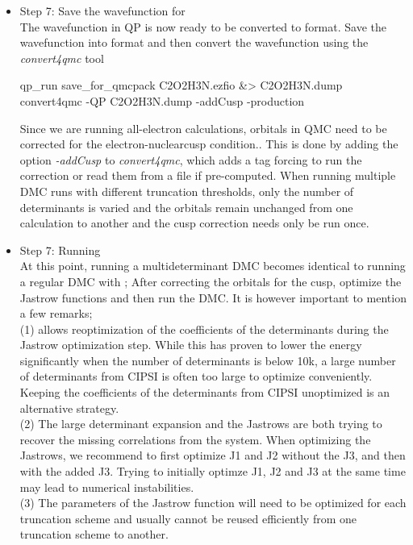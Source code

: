 \begin{itemize}
\item Step 7: Save the wavefunction for \qmcpack \\
The wavefunction in QP is now ready to be converted to \qmcpack format.
Save the wavefunction into \qmcpack format and then convert the wavefunction using the \textit{convert4qmc} tool\\

\begin{shade}
qp_run save_for_qmcpack C2O2H3N.ezfio &> C2O2H3N.dump  
convert4qmc -QP C2O2H3N.dump -addCusp -production
\end{shade}

Since we are running all-electron calculations, orbitals in QMC need
to be corrected for the electron-nuclearcusp condition..  This is done
by adding the option \textit{-addCusp} to \textit{convert4qmc}, which
adds a tag forcing \qmcpack to run the correction or read them from a
file if pre-computed. When running multiple DMC runs with different
truncation thresholds, only the number of determinants is varied and
the orbitals remain unchanged from one calculation to another and the
cusp correction needs only be run once.

\item Step 7: Running \qmcpack \\
At this point, running a multideterminant DMC becomes identical to running a regular DMC with \qmcpack; 
After correcting the orbitals for the cusp, optimize the Jastrow functions and then run the DMC. 
It is however important to mention a few remarks;\\

(1) \qmcpack allows reoptimization of the coefficients of the
determinants during the Jastrow optimization step. While this has
proven to lower the energy significantly when the number of
determinants is below 10k, a large number of determinants from CIPSI
is often too large to optimize conveniently. Keeping the coefficients
of the determinants from CIPSI unoptimized is an alternative strategy.\\

(2) The large determinant expansion and the Jastrows are both trying
to recover the missing correlations from the system. When optimizing
the Jastrows, we recommend to first optimize J1 and J2 without the J3,
and then with the added J3. Trying to initially optimze J1, J2 and J3
at the same time may lead to numerical instabilities.\\

(3) The parameters of the Jastrow function will need to be optimized
for each truncation scheme and usually cannot be reused efficiently
from one truncation scheme to another.


\end{itemize}
